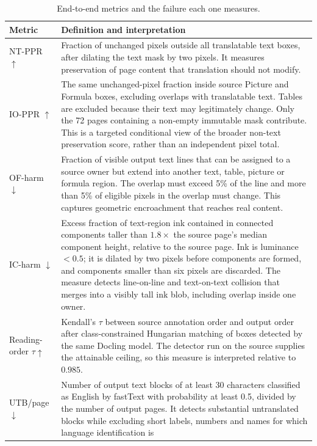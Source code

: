 \begin{table}[H]
\centering
\caption{End-to-end metrics and the failure each one measures.}
\label{tab:app-e2e-metrics}
\small
\setlength{\tabcolsep}{5pt}
\begin{tabularx}{\textwidth}{@{}l >{\raggedright\arraybackslash}X@{}}
\toprule
Metric & Definition and interpretation \\
\midrule
NT-PPR $\uparrow$ & Fraction of unchanged pixels outside all translatable text
boxes, after dilating the text mask by two pixels. It measures preservation of
page content that translation should not modify. \\
IO-PPR $\uparrow$ & The same unchanged-pixel fraction inside source Picture and
Formula boxes, excluding overlaps with translatable text. Tables are excluded
because their text may legitimately change. Only the 72 pages containing a
non-empty immutable mask contribute. This is a targeted conditional view of the
broader non-text preservation score, rather than an independent pixel total. \\
OF-harm $\downarrow$ & Fraction of visible output text lines that can be assigned
to a source owner but extend into another text, table, picture or formula region.
The overlap must exceed 5\% of the line and more than 5\% of eligible pixels in
the overlap must change. This captures geometric encroachment that reaches real
content. \\
IC-harm $\downarrow$ & Excess fraction of text-region ink contained in connected
components taller than $1.8\times$ the source page's median component height,
relative to the source page. Ink is luminance $<0.5$; it is dilated by two pixels
before components are formed, and components smaller than six pixels are
discarded. The measure detects line-on-line and text-on-text collision that
merges into a visibly tall ink blob, including overlap inside one owner. \\
Reading-order $\tau\uparrow$ & Kendall's $\tau$ between source annotation order
and output order after class-constrained Hungarian matching of boxes detected by
the same Docling model. The detector run on the source supplies the attainable
ceiling, so this measure is interpreted relative to $0.985$. \\
UTB/page $\downarrow$ & Number of output text blocks of at least 30 characters
classified as English by fastText with probability at least 0.5, divided by the
number of output pages. It detects substantial untranslated blocks while
excluding short labels, numbers and names for which language identification is

\end{tabularx}
\end{table}
